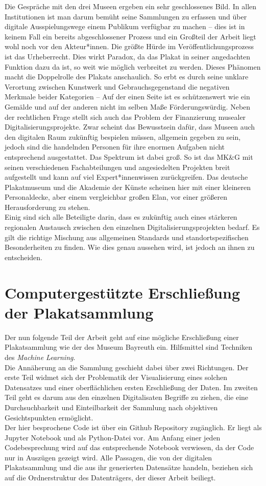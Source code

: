 \documentclass[a4paper,12pt,ngerman]{article}
\begin{document}
Die Gespräche mit den drei Museen ergeben ein sehr geschlossenes Bild. In allen Institutionen ist man darum bemüht seine Sammlungen zu erfassen und über digitale Ausspielungswege einem Publikum verfügbar zu machen – dies ist in keinem Fall ein bereits abgeschlossener Prozess und ein Großteil der Arbeit liegt wohl noch vor den Akteur*innen. Die größte Hürde im Veröffentlichungsprozess ist das Urheberrecht. Dies wirkt Paradox, da das Plakat in seiner angedachten Funktion dazu da ist, so weit wie möglich verbreitet zu werden. Dieses Phänomen macht die Doppelrolle des Plakats anschaulich. So erbt es durch seine unklare Verortung zwischen Kunstwerk und Gebrauchsgegenstand die negativen Merkmale beider Kategorien – Auf der einen Seite ist es schützenswert wie ein Gemälde und auf der anderen nicht im selben Maße Förderungswürdig. Neben der rechtlichen Frage stellt sich auch das Problem der Finanzierung musealer Digitalisierungsprojekte. Zwar scheint das Bewusstsein dafür, dass Museen auch den digitalen Raum zukünftig bespielen müssen, allgemein gegeben zu sein, jedoch sind die handelnden Personen für ihre enormen Aufgaben nicht entsprechend ausgestattet. Das Spektrum ist dabei groß. So ist das MK\&G mit seinen verschiedenen Fachabteilungen und angesiedelten Projekten breit aufgestellt und kann auf viel Expert*innenwissen zurückgreifen. Das deutsche Plakatmuseum und die Akademie der Künste scheinen hier mit einer kleineren Personaldecke, aber einem vergleichbar großen Elan, vor einer größeren Herausforderung zu stehen. \\
Einig sind sich alle Beteiligte darin, dass es zukünftig auch eines stärkeren regionalen Austausch zwischen den einzelnen Digitalisierungsprojekten bedarf. Es gilt die richtige Mischung aus allgemeinen Standards und standortspezifischen Besonderheiten zu finden. Wie dies genau aussehen wird, ist jedoch an ihnen zu entscheiden. \\

\section{Computergestützte Erschließung der Plakatsammlung}
Der nun folgende Teil der Arbeit geht auf eine mögliche Erschließung einer Plakatsammlung wie der des Museum Bayreuth ein. Hilfsmittel sind Techniken des \textit{Machine Learning}. \\
Die Annäherung an die Sammlung geschieht dabei über zwei Richtungen. Der erste Teil widmet sich der Problematik der Visualisierung eines solchen Datensatzes und einer oberflächlichen ersten Erschließung der Daten. Im zweiten Teil geht es darum aus den einzelnen Digitalisaten Begriffe zu ziehen, die eine Durchsuchbarkeit und Einteilbarkeit der Sammlung nach objektiven Gesichtspunkten ermöglicht. \\
Der hier besprochene Code ist über ein Github Repository zugänglich. Er liegt als Jupyter Notebook und als Python-Datei vor. Am Anfang einer jeden Codebesprechung wird auf das entsprechende Notebook verwiesen, da der Code nur in Auszügen gezeigt wird. Alle Passagen, die von der digitalen Plakatsammlung und die aus ihr generierten Datensätze handeln, beziehen sich auf die Ordnerstruktur des Datenträgers, der dieser Arbeit beiliegt. \\
\end{document}
